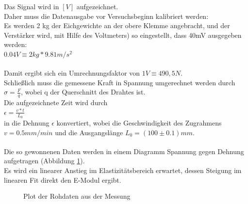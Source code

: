 \documentclass[12pt,a4paper]{article}
\begin{document}
\begin{multicols}{2}
Das Signal wird in $[V]$ aufgezeichnet.\\
Daher muss die Datenausgabe vor Versuchsbeginn kalibriert werden:\\
Es werden 2 kg der Eichgewichte an der obere Klemme angebracht, und der Verstärker wird, mit Hilfe des Voltmeters) so eingestellt, dass 40mV ausgegeben werden:\\
$0.04 V \equiv 2 kg * 9.81 m/s^2 $\\
\\
Damit ergibt sich ein Umrechnungsfaktor von $1V \equiv 490,5 N $.\\
Schließlich muss die gemessene Kraft in Spannung umgerechnet werden durch $\sigma = \frac{F}{q}$, wobei q der Querschnitt des Drahtes ist.\\
Die aufgezeichnete Zeit wird durch\\
$ \epsilon = \frac{v*t}{L_{0}} $\\
in die Dehnung $\epsilon$ konvertiert, wobei die Geschwindigkeit des Zugrahmens\\
 $v = 0.5 mm/min$ und die Ausgangslänge $ L_{0} = (100 \pm 0.1) mm $.\\
\\
Die so gewonnenen Daten werden in einem Diagramm Spannung gegen Dehnung aufgetragen (Abbildung \ref{fig:orig_Vs_plot}).\\
Es wird ein linearer Anstieg im Elastizitätsbereich erwartet, dessen Steigung im linearen Fit direkt den E-Modul ergibt.\\

\begin{figure}[H]
    	\caption{Plot der Rohdaten aus der Messung}
	\label{fig:orig_Vs_plot}
\end{figure}



\end{multicols}
\end{document}
